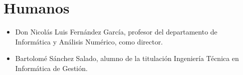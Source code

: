 \section{Humanos}

\begin{itemize}
   \item Don Nicolás Luis Fernández García, profesor del departamento de
   Informática y Análisis Numérico, como director.
   \item Bartolomé Sánchez Salado, alumno de la titulación Ingeniería Técnica en
   Informática de Gestión.
\end{itemize}

